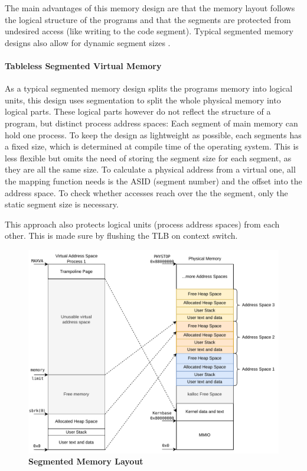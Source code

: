 The main advantages of this memory design are that the memory layout follows the logical structure of the programs and that the segments are protected from undesired access (like writing to the code segment).
Typical segmented memory designs also allow for dynamic segment sizes \cite{tanenbaumOS}.



\paragraph{Tableless Segmented Virtual Memory}
As a typical segmented memory design splits the programs memory into logical units, this design uses segmentation to split the whole physical memory into logical parts.
These logical parts however do not reflect the structure of a program, but distinct process address spaces: Each segment of main memory can hold one process.
To keep the design as lightweight as possible, each segments has a fixed size, which is determined at compile time of the operating system.
This is less flexible but omits the need of storing the segment size for each segment, as they are all the same size.
To calculate a physical address from a virtual one, all the mapping function needs is the ASID (segment number) and the offset into the address space.
To check whether accesses reach over the the segment, only the static segment size is necessary.

This approach also protects logical units (process address spaces) from each other. This is made sure
by flushing the TLB on context switch.



\begin{figure}[ht!]
    \centering
    \includegraphics[]{figures/segmented_layout.pdf}
    \caption[Segmented Memory Layout]{\textbf{Segmented Memory Layout}}
    \label{fig:theory:segLayout}
\end{figure}

